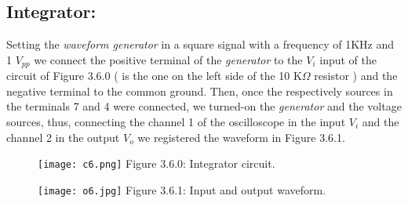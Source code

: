 \subsection{Integrator:}

Setting the {\itshape waveform generator} in a square signal with a frequency of 1KHz and 1 $V_{pp}$ we connect the positive terminal of the {\itshape generator} to the $V_{i}$ input of the circuit of Figure 3.6.0 ( is the one on the left side of the 10 K$\Omega$ resistor ) and the negative terminal to the common ground. Then, once the respectively sources in the terminals 7 and 4 were connected, we turned-on the {\itshape generator} and the voltage sources, thus, connecting the channel 1 of the oscilloscope in the input $V_{i}$ and the channel 2 in the output $V_{o}$ we registered the waveform in Figure 3.6.1. \hfill \break

\begin{multicols}{2}
\begin{figure}[H]
\texttt{[image: c6.png]}
\centering \linebreak \linebreak Figure 3.6.0: Integrator circuit.
\end{figure}

\begin{figure}[H]
\texttt{[image: o6.jpg]}
\centering \linebreak \linebreak Figure 3.6.1: Input and output waveform.
\end{figure}
\end{multicols} \hfill

{\bfseries\itshape\color{carmine}{Observation:}} {\itshape\color{carmine}{The input waveform is a square wave, as an effect of the integration the output waveform is a triangle wave.}}